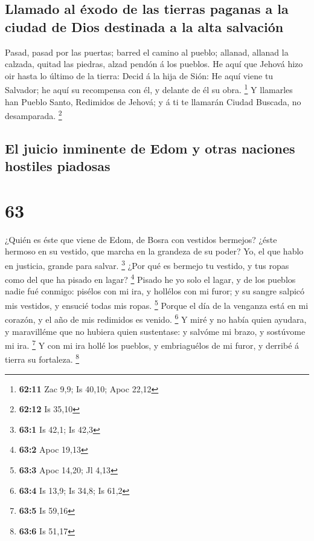 \hypertarget{llamado-al-uxe9xodo-de-las-tierras-paganas-a-la-ciudad-de-dios-destinada-a-la-alta-salvaciuxf3n}{%
\subsection{Llamado al éxodo de las tierras paganas a la ciudad de Dios
destinada a la alta
salvación}\label{llamado-al-uxe9xodo-de-las-tierras-paganas-a-la-ciudad-de-dios-destinada-a-la-alta-salvaciuxf3n}}

 Pasad, pasad por las puertas; barred el camino al
pueblo; allanad, allanad la calzada, quitad las piedras, alzad pendón á
los pueblos.  He aquí que Jehová hizo oir hasta lo último
de la tierra: Decid á la hija de Sión: He aquí viene tu Salvador; he
aquí su recompensa con él, y delante de él su obra. \footnote{\textbf{62:11}
  Zac 9,9; Is 40,10; Apoc 22,12}  Y llamarles han Pueblo
Santo, Redimidos de Jehová; y á ti te llamarán Ciudad Buscada, no
desamparada. \footnote{\textbf{62:12} Is 35,10}

\hypertarget{el-juicio-inminente-de-edom-y-otras-naciones-hostiles-piadosas}{%
\subsection{El juicio inminente de Edom y otras naciones hostiles
piadosas}\label{el-juicio-inminente-de-edom-y-otras-naciones-hostiles-piadosas}}

\hypertarget{section-62}{%
\section{63}\label{section-62}}

 ¿Quién es éste que viene de Edom, de Bosra con vestidos
bermejos? ¿éste hermoso en su vestido, que marcha en la grandeza de su
poder? Yo, el que hablo en justicia, grande para salvar. \footnote{\textbf{63:1}
  Is 42,1; Is 42,3}  ¿Por qué es bermejo tu vestido, y tus
ropas como del que ha pisado en lagar? \footnote{\textbf{63:2} Apoc
  19,13}  Pisado he yo solo el lagar, y de los pueblos
nadie fué conmigo: pisélos con mi ira, y hollélos con mi furor; y su
sangre salpicó mis vestidos, y ensucié todas mis ropas. \footnote{\textbf{63:3}
  Apoc 14,20; Jl 4,13}  Porque el día de la venganza está
en mi corazón, y el año de mis redimidos es venido. \footnote{\textbf{63:4}
  Is 13,9; Is 34,8; Is 61,2}  Y miré y no había quien
ayudara, y maravilléme que no hubiera quien sustentase: y salvóme mi
brazo, y sostúvome mi ira. \footnote{\textbf{63:5} Is 59,16}
 Y con mi ira hollé los pueblos, y embriaguélos de mi
furor, y derribé á tierra su fortaleza. \footnote{\textbf{63:6} Is 51,17}

